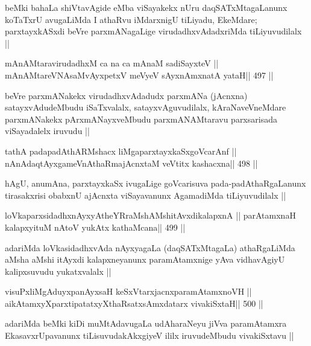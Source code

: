 \begin{artha}
beMki bahaLa shiVtavAgide eMba viSayakekx nUru daqSATxMtagaLanunx
koTaTxrU avugaLiMda I athaRvu iMdarxnigU tiLiyadu, EkeMdare;
parxtayxkASxdi beVre parxmANagaLige virudadhxvAdadxriMda
tiLiyuvudilalx ||
\end{artha}

\begin{shl}
mAnAMtaravirudadhxM ca na ca mAnaM sadiSayxteV ||
mAnAMtareVNAsaMvAyxpetxV meVyeV sAyxnAmxnatA yataH\hfill || 497 ||
\end{shl}

\begin{artha}
beVre parxmANakekx virudadhxvAdadudx parxmANa (jAcnxna)
satayxvAdudeMbudu iSaTxvalalx, satayxvAguvudilalx, kAraNaveVneMdare
parxmANakekx pArxmANayxveMbudu parxmANAMtaravu parxsarisada
viSayadalelx iruvudu ||
\end{artha}

\begin{shl}
tathA padapadAthARMshacx liMgaparxtayxkaSxgoVcarAnf ||
nAnAdaqtAyx\s\s gameVnAthaRmajAcnxtaM veVtitx kashacxna\hfill || 498 ||
\end{shl}

\begin{artha}
hAgU, anumAna, parxtayxkaSx ivugaLige goVcarisuva
pada-padAthaRgaLanunx tirasakxrisi obabxnU ajAcnxta viSayavanunx
AgamadiMda tiLiyuvudilalx ||
\end{artha}

\begin{shl}
loVkaparxsidadhxnAyxyAtheYRraMshAMshitAvxdikalapxnA ||
parAtamxnaH kalapxyituM nAtoV yukAtx kathaMcana\hfill || 499 ||
\end{shl}

\begin{artha}
adariMda loVkasidadhxvAda nAyxyagaLa (daqSATxMtagaLa) athaRgaLiMda
aMsha aMshi itAyxdi kalapxneyanunx paramAtamxnige yAva vidhavAgiyU
kalipxsuvudu yukatxvalalx ||
\end{artha}



\begin{shl}
visuPxliMgAduyxpanAyxsaH keSxVtarxjacnxparamAtamxnoVH ||
aikAtamxyXparxtipatatxyXthaRsatxsAmxdatarx vivakiSxtaH\hfill || 500 ||
\end{shl}

\begin{artha}
adariMda beMki kiDi muMtAdavugaLa udAharaNeyu jiVva paramAtamxra
EkasavxrUpavanunx tiLisuvudakAkxgiyeV ililx iruvudeMbudu vivakiSxtavu ||
\end{artha}

